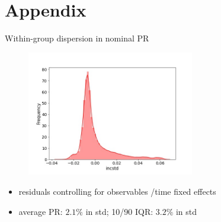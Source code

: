 \documentclass{beamer}
\begin{document}


\section*{Appendix}



\begin{frame}{Within-group dispersion in nominal PR}
	\label{appendix:incstd}
	\begin{figure}
		\centering
		\includegraphics[width=0.65\textwidth]{figures/hist_incstd.jpg}
	\end{figure}
	\begin{itemize}
		\item  residuals controlling for observables /time fixed effects
		\item average PR:  $2.1\%$ in std; 10/90 IQR: $3.2\%$ in std \quad \hyperlink{rincstd_hist}{}    
	\end{itemize}
\end{frame}
\end{document}
